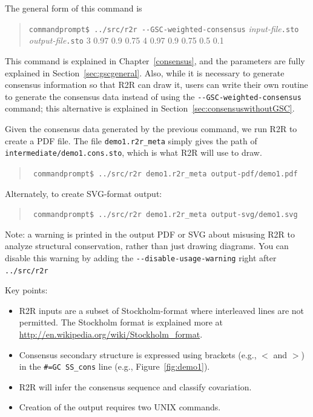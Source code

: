 \documentclass[letterpaper,12pt]{report}
\newcommand{\example}[1]{
\begin{quote}
{\raggedright
#1
}
\end{quote}
}
\newcommand{\examplett}[1]{
\example{{\tt #1}}
}
\begin{document}
The general form of this command is
\example{
{\tt commandprompt\$ ../src/r2r -{}-GSC-weighted-consensus} {\it input-file}{\tt .sto}\\
\hspace{0.5in} {\it output-file}{\tt .sto} 3 0.97 0.9 0.75 4 0.97 0.9 0.75 0.5 0.1
}
This command is explained in Chapter~\ref{consensus}, and the parameters are fully explained in
Section~\ref{sec:gscgeneral}.
Also, while it is necessary to generate consensus information so that R2R can draw it,
users can write their own routine to generate the consensus data instead of using
the {\tt -{}-GSC-weighted-consensus} command; this alternative is
explained in Section~\ref{sec:consensuswithoutGSC}.

Given the consensus data generated by the previous command, we run R2R to create a PDF file.  The file {\tt demo1.r2r\_meta} simply
gives the path of {\tt intermediate/demo1.cons.sto}, which is what R2R will use to draw.

\examplett{
commandprompt\$ ../src/r2r demo1.r2r\_meta output-pdf/demo1.pdf
}

Alternately, to create SVG-format output:
\examplett{
commandprompt\$ ../src/r2r demo1.r2r\_meta output-svg/demo1.svg
}

Note: a warning is printed in the output PDF or SVG about misusing R2R to analyze structural conservation, rather than just drawing diagrams.  You can disable this warning by adding the {\tt -{}-disable-usage-warning} right after {\tt ../src/r2r}

Key points:
\begin{itemize}
\item R2R inputs are a subset of Stockholm-format where interleaved lines are not permitted.  The Stockholm format is explained more at \url{http://en.wikipedia.org/wiki/Stockholm_format}.
\item Consensus secondary structure is expressed using brackets (e.g., $<$ and $>$) in the {\tt \#=GC SS\_cons} line (e.g., Figure~\ref{fig:demo1}).
\item R2R will infer the consensus sequence and classify covariation.
\item Creation of the output requires two UNIX commands.
\end{itemize}
\end{document}
